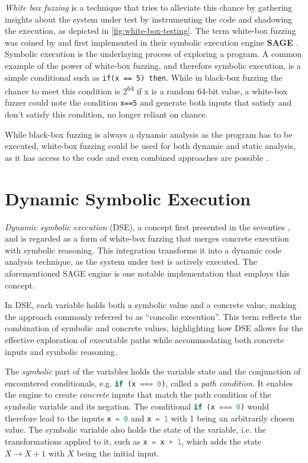 \textit{White box fuzzing} is a technique that tries to alleviate this chance by gathering insights about the system under test by instrumenting the code and shadowing the execution, as depicted in \autoref{fig:white-box-testing}.
The term white-box fuzzing was coined by \citet{godefroid_automated_2008} and first implemented in their symbolic execution engine \textbf{SAGE} \cite{godefroid_sage_2012}. Symbolic execution is the underlaying process of exploring a program.
A common example of the power of white-box fuzzing, and therefore symbolic execution,  is a simple conditional such as \lstinline+if(x == 5) then+. While in black-box fuzzing the chance to meet this condition is 2\textsuperscript{64} if x is a random 64-bit value, a white-box fuzzer could note the condition \lstinline+x==5+ and generate both inputs that satisfy and don't satisfy this condition, no longer reliant on chance. \cite{godefroid_automated_2008}

While black-box fuzzing is always a dynamic analysis as the program has to be executed, white-box fuzzing could be used for both dynamic and static analysis, as it has access to the code and even combined approaches are possible \cite{artho_combined_2005}.



\section{Dynamic Symbolic Execution}
\label{sec:dse}
\textit{Dynamic symbolic execution} (DSE), a concept first presented in the seventies \cite{boyer_selectformal_1975}\cite{king_new_1975}\cite{king_symbolic_1976}, and is regarded as a form of white-box fuzzing that merges concrete execution with symbolic reasoning. This integration transforms it into a dynamic code analysis technique, as the system under test is actively executed. The aforementioned SAGE engine is one notable implementation that employs this concept.

In DSE, each variable holds both a symbolic value and a concrete value, making the approach commonly referred to as “concolic execution”. This term reflects the combination of symbolic and concrete values, highlighting how DSE allows for the effective exploration of executable paths while accommodating both concrete inputs and symbolic reasoning. 

The \textit{symbolic} part of the variables holds the variable state and the conjunction of encountered conditionals, e.g. \lstinline[language=JavaScript]+if (x === 0)+, called a \textit{path condition}. 
It enables the engine to create \textit{concrete} inputs that match the path condition of the symbolic variable and its negation. 
The conditional
\lstinline[language=JavaScript]+if (x === 0)+ would therefore lead to the inputs 
\lstinline[language=JavaScript]+x = 0+ and
\lstinline[language=JavaScript]+x = 1+ with 1 being an arbitrarily chosen value. The symbolic variable also holds the state of the variable, i.e. the transformations applied to it, such as 
\lstinline[language=JavaScript]@x = x + 1@, 
which adds the state
$X \rightarrow X+1$
 with 
$X$ being the initial input.




